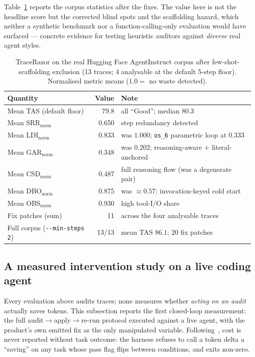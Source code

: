 \documentclass[11pt]{article}
\newcommand{\code}[1]{\texttt{#1}}
\begin{document}
Table~\ref{tab:agentinstruct} reports the corpus statistics after the fixes.
The value here is not the headline score but the corrected blind spots and the
scaffolding hazard, which neither a synthetic benchmark nor a
function-calling-only evaluation would have surfaced --- concrete evidence for
testing heuristic auditors against \emph{diverse} real agent styles.

\begin{table}[t]
\centering
\caption{TraceRazor on the real Hugging Face AgentInstruct corpus after
few-shot-scaffolding exclusion (13 traces; 4 analysable at the default 5-step
floor). Normalised metric means ($1.0=$ no waste detected).}
\label{tab:agentinstruct}
\begin{tabular}{lrl}
\toprule
Quantity & Value & Note \\
\midrule
Mean TAS (default floor) & 79.8  & all ``Good''; median 80.3 \\
Mean SRR$_\text{norm}$ & 0.650 & step redundancy detected \\
Mean LDI$_\text{norm}$ & 0.833 & was $1.000$; \code{os\_6} parametric loop at $0.333$ \\
Mean GAR$_\text{norm}$ & 0.348 & was $0.202$; reasoning-aware $+$ literal-anchored \\
Mean CSD$_\text{norm}$ & 0.487 & full reasoning flow (was a degenerate pair) \\
Mean DBO$_\text{norm}$ & 0.875 & was $\approx0.57$; invocation-keyed cold start \\
Mean OBS$_\text{norm}$ & 0.930 & high tool-I/O share \\
Fix patches (sum)     & 11    & across the four analysable traces \\
Full corpus (\code{-{}-min-steps 2}) & 13/13 & mean TAS $86.1$; $20$ fix patches \\
\bottomrule
\end{tabular}
\end{table}

\subsection{A measured intervention study on a live coding agent}
\label{sec:livestudy}
Every evaluation above audits traces; none measures whether \emph{acting on an
audit} actually saves tokens. This subsection reports the first closed-loop
measurement: the full audit$\to$apply$\to$re-run protocol executed against a
live agent, with the product's own emitted fix as the only manipulated
variable. Following~\cite{agentsmatter}, cost is never reported without task
outcome: the harness refuses to call a token delta a ``saving'' on any task
whose pass flag flips between conditions, and exits non-zero.
\end{document}
